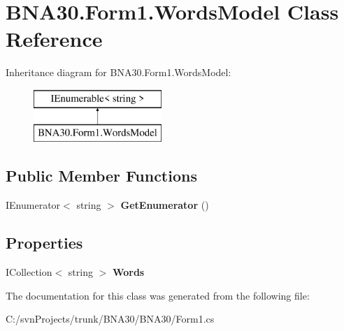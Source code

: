\hypertarget{class_b_n_a30_1_1_form1_1_1_words_model}{}\section{B\+N\+A30.\+Form1.\+Words\+Model Class Reference}
\label{class_b_n_a30_1_1_form1_1_1_words_model}
Inheritance diagram for B\+N\+A30.\+Form1.\+Words\+Model\+:\begin{figure}[H]
\begin{center}
\leavevmode
\includegraphics[height=2.000000cm]{class_b_n_a30_1_1_form1_1_1_words_model}
\end{center}
\end{figure}
\subsection*{Public Member Functions}
\begin{DoxyCompactItemize}
\item 
\mbox{\label{class_b_n_a30_1_1_form1_1_1_words_model_a91272c88b7b9f46185dfb9863a724486}} 
I\+Enumerator$<$ string $>$ {\bfseries Get\+Enumerator} ()
\end{DoxyCompactItemize}
\subsection*{Properties}
\begin{DoxyCompactItemize}
\item 
\mbox{\label{class_b_n_a30_1_1_form1_1_1_words_model_a31e89c188ff2b8daba1e5093aa1afbe9}} 
I\+Collection$<$ string $>$ {\bfseries Words}
\end{DoxyCompactItemize}


The documentation for this class was generated from the following file\+:\begin{DoxyCompactItemize}
\item 
C\+:/svn\+Projects/trunk/\+B\+N\+A30/\+B\+N\+A30/Form1.\+cs\end{DoxyCompactItemize}
